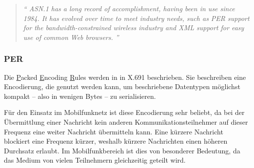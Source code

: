 
\cite{asn:itu:asn.1}
\begin{quotation}
	\textit{\enquote{
		ASN.1 has a long record of accomplishment, having been in use since 1984. It has evolved over time to meet industry needs, such as PER support for the bandwidth-constrained wireless industry and XML support for easy use of common Web browsers.
	}}
	\cite{asn:itu:asn.1}
\end{quotation}

\subsubsection{PER}

Die \underline{P}acked \underline{E}ncoding \underline{R}ules werden in in X.691 \cite{asn:itu:x691} beschrieben.
Sie beschreiben eine Encodierung, die genutzt werden kann, um beschriebene Datentypen möglichst kompakt -- also in wenigen Bytes -- zu serialisieren.

Für den Einsatz im Mobilfunknetz ist diese Encodierung sehr beliebt, da bei der Übermittlung einer Nachricht kein anderen Kommunikationsteilnehmer auf dieser Frequenz eine weiter Nachricht übermitteln kann.
Eine kürzere Nachricht blockiert eine Frequenz kürzer, weshalb kürzere Nachrichten einen höheren Durchsatz erlaubt.
Im Mobilfunkbereich ist dies von besonderer Bedeutung, da das Medium von vielen Teilnehmern gleichzeitig geteilt wird. 